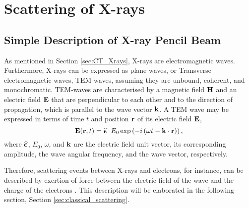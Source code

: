 \chapter{Scattering of X-rays}
\label{ch:scattering}
\section{Simple Description of X-ray Pencil Beam}
As mentioned in Section \ref{sec:CT_Xrays}, X-rays are electromagnetic waves.
Furthermore, X-rays can be expressed as plane waves, or Transverse electromagnetic waves, TEM-waves, assuming they are unbound, coherent, and monochromatic.
TEM-waves are characterised by a magnetic field $\bm{\mathrm{H}}$ and an electric field $\bm{\mathrm{E}}$ that are perpendicular to each other and to the direction of propagation, which is parallel to the wave vector $\bm{\mathrm{k}}$.
A TEM wave may be expressed in terms of time $t$ and position $\bm{\mathrm{r}}$ of its electric field $\bm{\mathrm{E}}$,
\begin{equation}\label{eq:TEM_wave}
    \bm{\mathrm{E}}(\bm{\mathrm{r}},t) = \mathrm{\boldsymbol{\widehat{\epsilon}}} \left. \right.  E_{0} \exp\left(-i\left(\omega t - \bm{\mathrm{k}}\cdot\bm{\mathrm{r}}\right)\right),
\end{equation}
where $\mathrm{\boldsymbol{\widehat{\epsilon}}}$, $E_{0}$, $\omega$, and $\bm{\mathrm{k}}$ are the electric field unit vector, its corresponding amplitude, the wave angular frequency, and the wave vector, respectively.

Therefore, scattering events between X-rays and electrons, for instance, can be described by
exertion of force between the electric field of the wave and the charge of the electrons \cite{mcmorrow2011elements}.
This description will be elaborated in the following section, Section \ref{sec:classical_scattering}.


